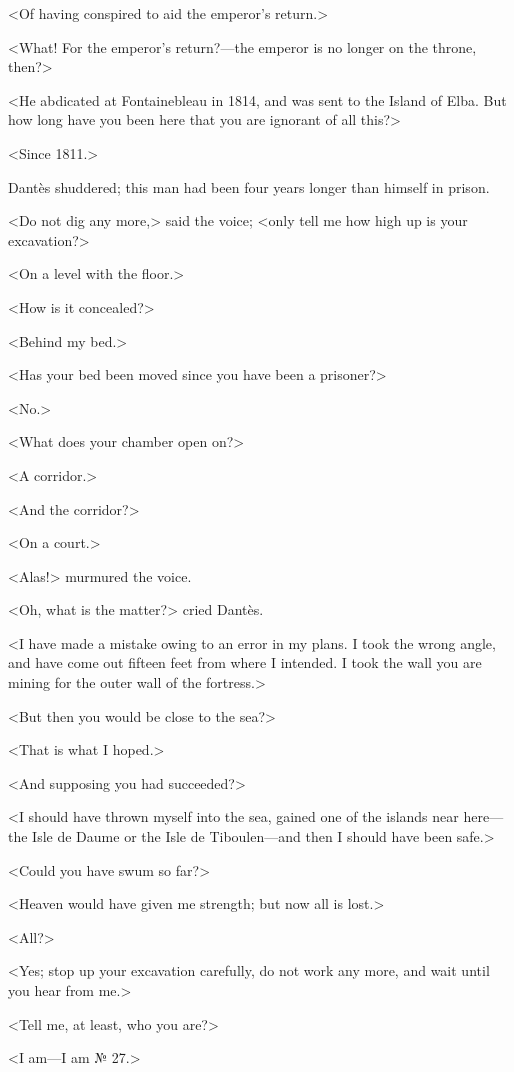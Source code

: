  <Of having conspired to aid the emperor's return.> 

 <What! For the emperor's return?—the emperor is no longer on the throne, then?> 

 <He abdicated at Fontainebleau in 1814, and was sent to the Island of Elba. But how long have you been here that you are ignorant of all this?> 

 <Since 1811.> 

 Dantès shuddered; this man had been four years longer than himself in prison. 

 <Do not dig any more,> said the voice; <only tell me how high up is your excavation?> 

 <On a level with the floor.> 

 <How is it concealed?> 

 <Behind my bed.> 

 <Has your bed been moved since you have been a prisoner?> 

 <No.> 

 <What does your chamber open on?> 

 <A corridor.> 

 <And the corridor?> 

 <On a court.> 

 <Alas!> murmured the voice. 

 <Oh, what is the matter?> cried Dantès. 

 <I have made a mistake owing to an error in my plans. I took the wrong angle, and have come out fifteen feet from where I intended. I took the wall you are mining for the outer wall of the fortress.> 

 <But then you would be close to the sea?> 

 <That is what I hoped.> 

 <And supposing you had succeeded?> 

 <I should have thrown myself into the sea, gained one of the islands near here—the Isle de Daume or the Isle de Tiboulen—and then I should have been safe.> 

 <Could you have swum so far?> 

 <Heaven would have given me strength; but now all is lost.> 

 <All?> 

 <Yes; stop up your excavation carefully, do not work any more, and wait until you hear from me.> 

 <Tell me, at least, who you are?> 

 <I am—I am № 27.> 

